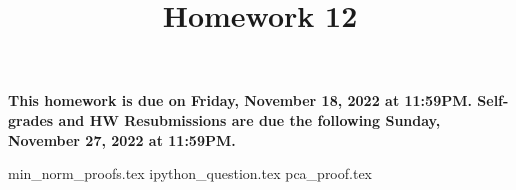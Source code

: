 \documentclass{eecs16b-assignment}
\begin{document}
\title{Homework 12}
\maketitle

{\Large\textbf{This homework is due on Friday, November 18, 2022 at 11:59PM. Self-grades and HW Resubmissions are due the following Sunday, November 27, 2022 at 11:59PM.}}

\begin{problemlist}
	{min_norm_proofs.tex}
	\newpage
	{ipython_question.tex}
	\newpage	
	{pca_proof.tex}


\end{problemlist}
\end{document}
